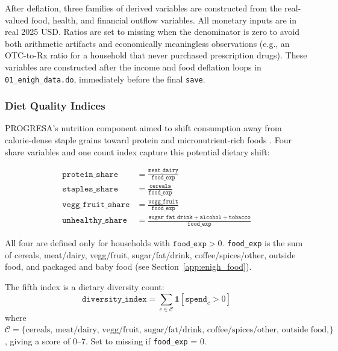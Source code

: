 After deflation, three families of derived variables are constructed from the
real-valued food, health, and financial outflow variables. All monetary inputs
are in real 2025 USD. Ratios are set to missing when the denominator is zero
to avoid both arithmetic artifacts and economically meaningless observations
(e.g., an OTC-to-Rx ratio for a household that never purchased prescription
drugs). These variables are constructed after the income and food deflation
loops in \texttt{01\_enigh\_data.do}, immediately before the final
\texttt{save}.

\subsubsection{Diet Quality Indices}
\label{app:enigh_diet}

PROGRESA's nutrition component aimed to shift consumption away from
calorie-dense staple grains toward protein and micronutrient-rich foods
\citep{hoddinott2008,leroy2008}. Four share variables and one count index
capture this potential dietary shift:

\begin{align}
\texttt{protein\_share}    &= \frac{\texttt{meat\_dairy}}{\texttt{food\_exp}}
    \label{eq:protein_share} \\[4pt]
\texttt{staples\_share}    &= \frac{\texttt{cereals}}{\texttt{food\_exp}}
    \label{eq:staples_share} \\[4pt]
\texttt{vegg\_fruit\_share}&= \frac{\texttt{vegg\_fruit}}{\texttt{food\_exp}}
    \label{eq:vegg_share} \\[4pt]
\texttt{unhealthy\_share}  &= \frac{\texttt{sugar\_fat\_drink}
    + \texttt{alcohol} + \texttt{tobacco}}{\texttt{food\_exp}}
    \label{eq:unhealthy_share}
\end{align}

\noindent
All four are defined only for households with $\texttt{food\_exp} > 0$.
\texttt{food\_exp} is the sum of cereals, meat/dairy, vegg/fruit,
sugar/fat/drink, coffee/spices/other, outside food, and packaged and baby food
(see Section~\ref{app:enigh_food}).

The fifth index is a dietary diversity count:
\begin{equation}
\texttt{diversity\_index} = \sum_{c \in \mathcal{C}} \mathbf{1}[\texttt{spend}_c > 0]
\label{eq:diversity}
\end{equation}
where $\mathcal{C} = \{\text{cereals, meat/dairy, vegg/fruit, sugar/fat/drink,
coffee/spices/other, outside food, alcohol}\}$, giving a score of 0–7.
Set to missing if \texttt{food\_exp} = 0.

